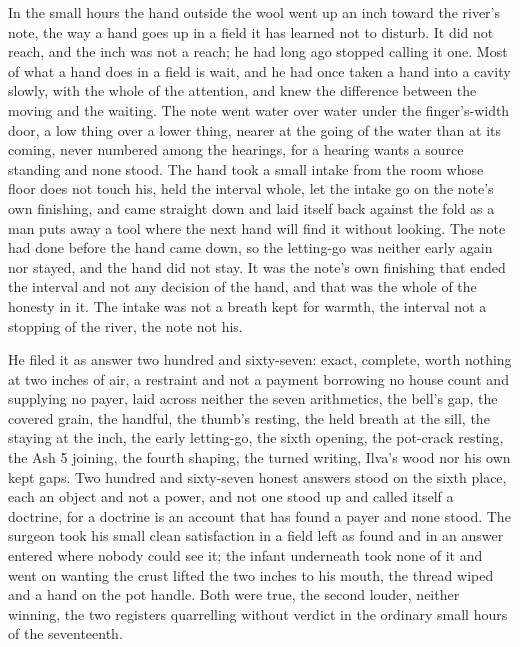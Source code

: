 In the small hours the hand outside the wool went up an inch toward the river's note, the way a hand goes up in a field it has learned not to disturb. It did not reach, and the inch was not a reach; he had long ago stopped calling it one. Most of what a hand does in a field is wait, and he had once taken a hand into a cavity slowly, with the whole of the attention, and knew the difference between the moving and the waiting. The note went water over water under the finger's-width door, a low thing over a lower thing, nearer at the going of the water than at its coming, never numbered among the hearings, for a hearing wants a source standing and none stood. The hand took a small intake from the room whose floor does not touch his, held the interval whole, let the intake go on the note's own finishing, and came straight down and laid itself back against the fold as a man puts away a tool where the next hand will find it without looking. The note had done before the hand came down, so the letting-go was neither early again nor stayed, and the hand did not stay. It was the note's own finishing that ended the interval and not any decision of the hand, and that was the whole of the honesty in it. The intake was not a breath kept for warmth, the interval not a stopping of the river, the note not his.

He filed it as answer two hundred and sixty-seven: exact, complete, worth nothing at two inches of air, a restraint and not a payment borrowing no house count and supplying no payer, laid across neither the seven arithmetics, the bell's gap, the covered grain, the handful, the thumb's resting, the held breath at the sill, the staying at the inch, the early letting-go, the sixth opening, the pot-crack resting, the Ash 5 joining, the fourth shaping, the turned writing, Ilva's wood nor his own kept gaps. Two hundred and sixty-seven honest answers stood on the sixth place, each an object and not a power, and not one stood up and called itself a doctrine, for a doctrine is an account that has found a payer and none stood. The surgeon took his small clean satisfaction in a field left as found and in an answer entered where nobody could see it; the infant underneath took none of it and went on wanting the crust lifted the two inches to his mouth, the thread wiped and a hand on the pot handle. Both were true, the second louder, neither winning, the two registers quarrelling without verdict in the ordinary small hours of the seventeenth.


